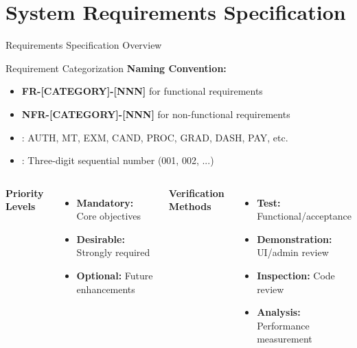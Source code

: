 \section{System Requirements Specification}

\begin{frame}{Requirements Specification Overview}
    \begin{block}{Requirement Categorization}
        \textbf{Naming Convention:}
        \begin{itemize}
            \item \textbf{FR-[CATEGORY]-[NNN]} for functional requirements
            \item \textbf{NFR-[CATEGORY]-[NNN]} for non-functional requirements
            \item [CATEGORY]: AUTH, MT, EXM, CAND, PROC, GRAD, DASH, PAY, etc.
            \item [NNN]: Three-digit sequential number (001, 002, ...)
        \end{itemize}
    \end{block}
    
    \begin{columns}
        \textbf{Priority Levels}
        \begin{itemize}
            \item \textbf{Mandatory:} Core objectives
            \item \textbf{Desirable:} Strongly required
            \item \textbf{Optional:} Future enhancements
        \end{itemize}
        
        \textbf{Verification Methods}
        \begin{itemize}
            \item \textbf{Test:} Functional/acceptance
            \item \textbf{Demonstration:} UI/admin review
            \item \textbf{Inspection:} Code review
            \item \textbf{Analysis:} Performance measurement
        \end{itemize}
    \end{columns}
\end{frame}


